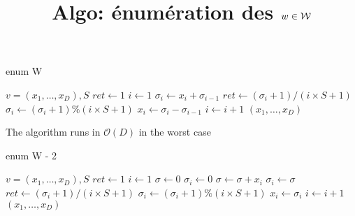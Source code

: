 \documentclass[10pt,a4paper]{article}
\title{Algo: énumération des $w\in\mathcal{W}$}
\begin{document}
\maketitle

\begin{algorithm}
  \caption{enum W}
  \begin{algorithmic}
    \REQUIRE $v=(x_1,\dots, x_D), S$
    \STATE $ret\leftarrow1$
    \STATE $i\leftarrow1$    
    \STATE $\sigma_i\leftarrow x_i+\sigma_{i-1}$
    \ENDFOR
    \STATE $ret\leftarrow(\sigma_i+1)/(i\times S+1)$
    \STATE $\sigma_i\leftarrow(\sigma_i+1)\%(i\times S+1)$
    \STATE $x_i\leftarrow \sigma_i-\sigma_{i-1}$
    \STATE $i\leftarrow i+1$
    \ENDWHILE
    \RETURN $(x_1,\dots,x_D)$
  \end{algorithmic}
\end{algorithm}

The algorithm runs in $\mathcal{O}(D)$ in the worst case

\begin{algorithm}
  \caption{enum W - 2}
  \begin{algorithmic}
    \REQUIRE $v=(x_1,\dots, x_D), S$
    \STATE $ret\leftarrow1$
    \STATE $i\leftarrow1$
    \STATE $\sigma\leftarrow0$
    \STATE $\sigma_i\leftarrow0$
    \STATE $\sigma\leftarrow\sigma+x_i$
    \STATE $\sigma_i\leftarrow\sigma$
    \STATE $ret\leftarrow(\sigma_i+1)/(i\times S+1)$
    \STATE $\sigma_i\leftarrow(\sigma_i+1)\%(i\times S+1)$
    \STATE $x_i\leftarrow \sigma_i$ 
    \STATE $i\leftarrow i+1$
    \ENDWHILE
    \RETURN $(x_1,\dots,x_D)$
  \end{algorithmic}
\end{algorithm}
\end{document}
